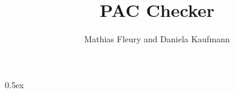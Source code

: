\documentclass[11pt,a4paper]{article}
\begin{document}
\title{PAC Checker}
\author{Mathias Fleury and Daniela Kaufmann}
\maketitle

\tableofcontents

\parindent 0pt\parskip 0.5ex



%
%
\end{document}
